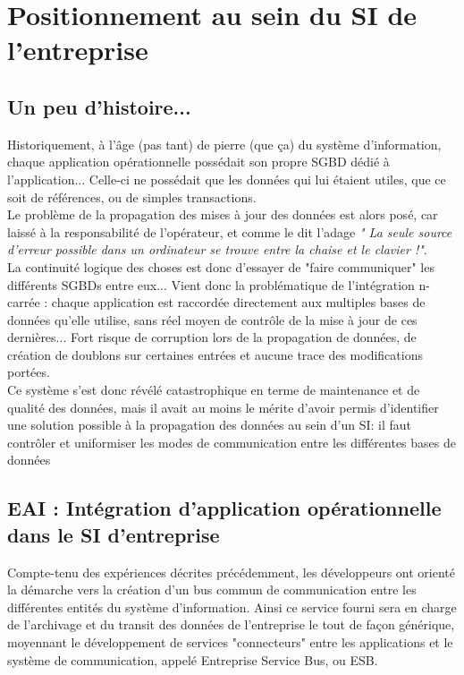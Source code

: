 \section{Positionnement au sein du SI de l'entreprise}

\subsection{ Un peu d'histoire...}

Historiquement, à l'âge (pas tant) de pierre (que ça) du système d'information, chaque application opérationnelle possédait son propre SGBD dédié à l'application... Celle-ci ne possédait que les données qui lui étaient utiles, que ce soit de références, ou de simples transactions.\\
Le problème de la propagation des mises à jour des données est alors posé, car laissé à la responsabilité de l'opérateur, et comme le dit l'adage \textit{" La seule source d'erreur possible dans un ordinateur se trouve entre la chaise et le clavier !"}.\\
La continuité logique des choses est donc d'essayer de "faire communiquer" les différents SGBDs entre eux... Vient donc la problématique de l'intégration n-carrée : chaque application est raccordée directement aux multiples bases de données qu'elle utilise, sans réel moyen de contrôle de la mise à jour de ces dernières... Fort risque de corruption lors de la propagation de données, de création de doublons sur certaines entrées et aucune trace des modifications portées. \\
Ce système s'est donc révélé catastrophique en terme de maintenance et de qualité des données, mais il avait au moins le mérite d'avoir permis d'identifier une solution possible à la propagation des données au sein d'un SI: il faut contrôler et uniformiser les modes de communication entre les différentes bases de données\\

\subsection{ EAI : Intégration d'application opérationnelle dans le SI d'entreprise}

Compte-tenu des expériences décrites précédemment, les développeurs ont orienté la démarche vers la création d'un bus commun de communication entre les différentes  entités du système d'information. Ainsi ce service fourni sera en charge de l'archivage et du transit des données de l'entreprise le tout de façon générique, moyennant le développement de services "connecteurs" entre les applications et le système de communication, appelé Entreprise Service Bus, ou ESB.\\

